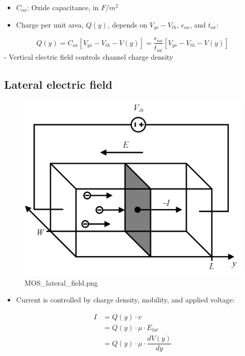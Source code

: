\documentclass[11pt]{article}
\providecommand{\tightlist}{%
      \setlength{\itemsep}{0pt}\setlength{\parskip}{0pt}}
\begin{document}
    \begin{itemize}
\tightlist
\item
  \(C_{ox}\): Oxide capacitance, in \(F/m^2\)
\item
  Charge per unit area, \(Q(y)\), depends on \(V_{gs} - V_{th}\),
  \(\epsilon_{ox}\), and \(t_{ox}\):
\end{itemize}

\begin{equation}
Q(y) = C_{ox}[V_{gs} - V_{th} - V(y)] = \dfrac{\epsilon_{ox}}{t_{ox}}[V_{gs} - V_{th} - V(y)]
\end{equation} - Vertical electric field controls channel charge density

    \hypertarget{lateral-electric-field}{%
\subsection{Lateral electric field}\label{lateral-electric-field}}

    \begin{figure}
\centering
\includegraphics{MOS_lateral_field.png}
\caption{MOS\_lateral\_field.png}
\end{figure}

    \begin{itemize}
\tightlist
\item
  Current is controlled by charge density, mobility, and applied
  voltage:
\end{itemize}

\begin{align}
I &= Q(y) \cdot v\\
&= Q(y) \cdot \mu \cdot E_{lat} \\
&= Q(y) \cdot \mu \cdot \dfrac{dV(y)}{dy}
\end{align}
\end{document}
